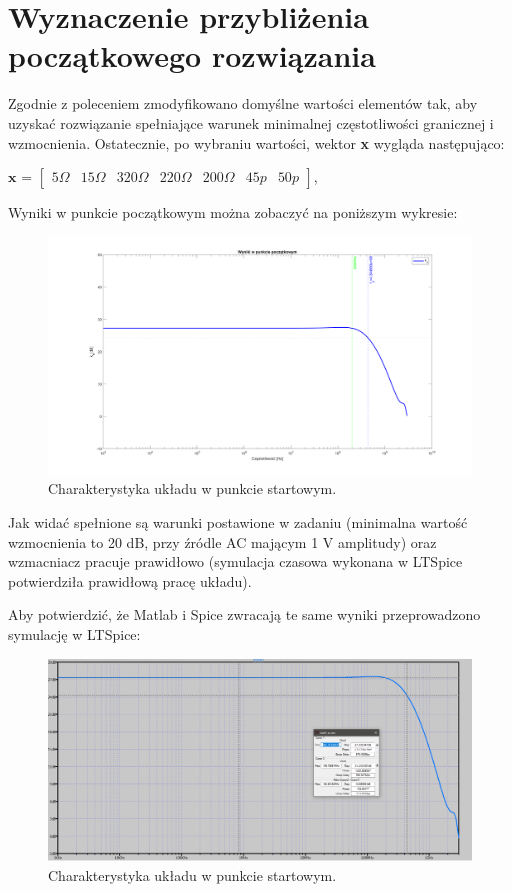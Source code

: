 \documentclass{article}
\begin{document}
\section{Wyznaczenie przybliżenia początkowego rozwiązania}
Zgodnie z poleceniem zmodyfikowano domyślne wartości elementów tak, aby uzyskać rozwiązanie spełniające warunek minimalnej częstotliwości granicznej i wzmocnienia.
Ostatecznie, po wybraniu wartości, wektor \textbf{x} wygląda następująco:
\begin{center}
    $\textbf{x}$ =
    $\begin{bmatrix}
            5\Omega & 15\Omega & 320\Omega & 220\Omega & 200\Omega & 45p & 50p
        \end{bmatrix}$,
\end{center}

Wyniki w punkcie początkowym można zobaczyć na poniższym wykresie:

\begin{figure}[h]
    \includegraphics[width=12cm]{graphics/starting_point.png}
    \centering
    \caption{Charakterystyka układu w punkcie startowym.}
\end{figure}

Jak widać spełnione są warunki postawione w zadaniu (minimalna wartość wzmocnienia to 20 dB, przy źródle AC mającym 1 V amplitudy) oraz wzmacniacz pracuje prawidłowo (symulacja czasowa wykonana w LTSpice potwierdziła prawidłową pracę układu).
\pagebreak

Aby potwierdzić, że Matlab i Spice zwracają te same wyniki przeprowadzono symulację w LTSpice:
\begin{figure}[h]
    \includegraphics[width=12cm]{graphics/starting_point_spice.png}
    \centering
    \caption{Charakterystyka układu w punkcie startowym.}
\end{figure}
\end{document}
